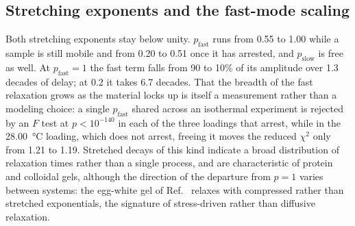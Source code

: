 \documentclass[11pt]{article}
\begin{document}
\subsection{Stretching exponents and the fast-mode scaling}
\label{sec:fastscaling}
Both stretching exponents stay below unity. $p_{\mathrm{fast}}$ runs from 0.55 to 1.00 while a sample is still mobile and from 0.20 to 0.51 once it has arrested, and $p_{\mathrm{slow}}$ is free as well. At $p_{\mathrm{fast}}=1$ the fast term falls from 90 to 10\% of its amplitude over 1.3 decades of delay; at 0.2 it takes 6.7 decades. That the breadth of the fast relaxation grows as the material locks up is itself a measurement rather than a modeling choice: a single $p_{\mathrm{fast}}$ shared across an isothermal experiment is rejected by an $F$ test at $p<10^{-140}$ in each of the three loadings that arrest, while in the \SI{28.00}{\degreeCelsius} loading, which does not arrest, freeing it moves the reduced $\chi^2$ only from 1.21 to 1.19. Stretched decays of this kind indicate a broad distribution of relaxation times rather than a single process, and are characteristic of protein and colloidal gels,\cite{Begam2021-fh,Bahadur2019-ln} although the direction of the departure from $p=1$ varies between systems: the egg-white gel of Ref.~ relaxes with compressed rather than stretched exponentials, the signature of stress-driven rather than diffusive relaxation.
\end{document}
